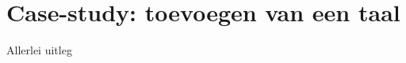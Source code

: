 \chapter{Case-study: toevoegen van een taal}\label{ch:case-study-toevoegen-van-een-taal}

Allerlei uitleg